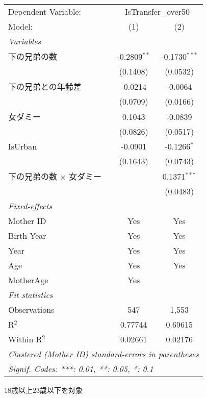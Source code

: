 \documentclass{article}
\begin{document}
\begingroup
\centering
\begin{threeparttable}[b]
   \begin{tabular}{lcc}
      \tabularnewline \midrule \midrule
      Dependent Variable: & \multicolumn{2}{c}{IsTransfer\_over50}\\
      Model:                          & (1)            & (2)\\  
      \midrule
      \emph{Variables}\\
      下の兄弟の数                    & -0.2809$^{**}$ & -0.1730$^{***}$\\   
                                      & (0.1408)       & (0.0532)\\   
      下の兄弟との年齢差              & -0.0214        & -0.0064\\   
                                      & (0.0709)       & (0.0166)\\   
      女ダミー                        & 0.1043         & -0.0839\\   
                                      & (0.0826)       & (0.0517)\\   
      IsUrban                         & -0.0901        & -0.1266$^{*}$\\   
                                      & (0.1643)       & (0.0743)\\   
      下の兄弟の数 $\times$ 女ダミー  &                & 0.1371$^{***}$\\   
                                      &                & (0.0483)\\   
      \midrule
      \emph{Fixed-effects}\\
      Mother ID                       & Yes            & Yes\\  
      Birth Year                      & Yes            & Yes\\  
      Year                            & Yes            & Yes\\  
      Age                             & Yes            & Yes\\  
      MotherAge                       & Yes            & \\  
      \midrule
      \emph{Fit statistics}\\
      Observations                    & 547            & 1,553\\  
      R$^2$                           & 0.77744        & 0.69615\\  
      Within R$^2$                    & 0.02661        & 0.02176\\  
      \midrule \midrule
      \multicolumn{3}{l}{\emph{Clustered (Mother ID) standard-errors in parentheses}}\\
      \multicolumn{3}{l}{\emph{Signif. Codes: ***: 0.01, **: 0.05, *: 0.1}}\\
   \end{tabular}
   
   \begin{tablenotes}\item 18歳以上23歳以下を対象
   \end{tablenotes}
\end{threeparttable}
\par\endgroup
\end{document}

